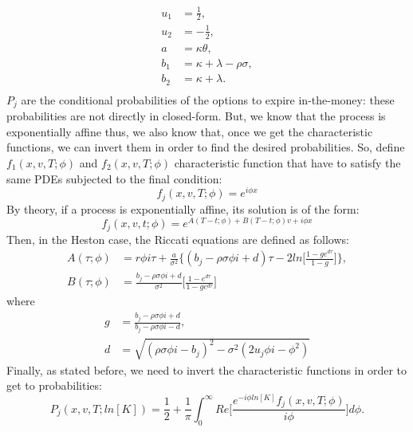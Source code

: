 \documentclass[paper=a4, fontsize=12pt]{scrartcl} %
\numberwithin{equation}{section}
\begin{document}
	\begin{equation}
	\begin{aligned}
		u_1 &= \frac{1}{2}, \\
		u_2 &= -\frac{1}{2},\\
		a &= \kappa \theta,\\
		b_1 &= \kappa + \lambda - \rho \sigma,\\
		b_2 &= \kappa+\lambda.\\
	\end{aligned}
	\end{equation}
$P_j$ are the conditional probabilities of the options to expire in-the-money: these probabilities are not directly in closed-form. But, we know that the process is exponentially affine thus, we also know that, once we get the characteristic functions, we can invert them in order to find the desired probabilities.
So, define $f_1(x, v, T; \phi)$ and $f_2(x, v, T; \phi)$ characteristic function that have to satisfy the same PDEs subjected to the final condition:
	\begin{equation}
		f_j(x, v, T; \phi) = e^{i\phi x}
	\end{equation} 
By theory, if a process is exponentially affine, its solution is of the form:
	\begin{equation}
		f_j(x, v, t; \phi) = e^{A(T-t; \phi) + B(T-t;\phi)v + i \phi x}
	\end{equation}
Then, in the Heston case, the Riccati equations are defined as follows:
	\begin{equation}
	\begin{aligned}
		A(\tau; \phi) &= r \phi i \tau + \frac{a}{\sigma^2} \bigg \{ (b_j - \rho \sigma \phi i + d) \tau - 2 ln \bigg [\frac{1-ge^{d\tau}}{1-g} \bigg] \bigg\}, \\
		B(\tau; \phi) &= \frac{b_j - \rho \sigma \phi i + d}{\sigma^2} \bigg [ \frac{1-e^{d\tau}}{1-ge^{d\tau}} \bigg]
	\end{aligned}
	\end{equation}
where
	\begin{equation}
	\begin{aligned}
		g &= \frac{b_j - \rho \sigma \phi i + d}{b_j - \rho \sigma \phi i - d}, \\
		d &= \sqrt{(\rho \sigma \phi i - b_j)^2 - \sigma^2(2u_j \phi i - \phi^2)}
	\end{aligned}
	\end{equation}
Finally, as stated before, we need to invert the characteristic functions in order to get to probabilities:
	\begin{equation}
		P_j(x, v, T; ln[K]) = \frac{1}{2} + \frac{1}{\pi} \int_0^\infty Re \bigg[ \frac{e^{-i \phi ln[K]} f_j(x, v, T; \phi)}{i \phi} \bigg] d\phi.
	\end{equation}
\end{document}
